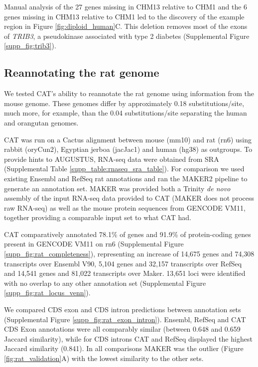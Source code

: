 \documentclass[fleqn,10pt]{wlscirep}
\begin{document}
Manual analysis of the 27 genes missing in CHM13 relative to CHM1 and the 6 genes missing in CHM13 relative to CHM1 led to the discovery of the example region in Figure \ref{fig:diploid_human}C. This deletion removes most of the exons of \textit{TRIB3}, a pseudokinase associated with type 2 diabetes \cite{shi2009association} (Supplemental Figure \ref{supp_fig:trib3}).

\subsection*{Reannotating the rat genome}

We tested CAT's ability to reannotate the rat genome using information from the mouse genome. These genomes differ by approximately 0.18 substitutions/site, much more, for example, than the 0.04 substitutions/site separating the human and orangutan genomes\cite{karolchik2003ucsc}.

CAT was run on a Cactus alignment between mouse (mm10) and rat (rn6) using rabbit (oryCun2), Egyptian jerboa (jacJac1) and human (hg38) as outgroups. To provide hints to AUGUSTUS, RNA-seq data were obtained from SRA \cite{fushan2015gene,cortez2014origins,liu2016identification} (Supplemental Table \ref{supp_table:rnaseq_sra_table}). For comparison we used existing Ensembl and RefSeq rat annotations and ran the MAKER2 pipeline \cite{cantarel2008maker} to generate an annotation set. MAKER was provided both a Trinity \cite{haas2013novo} \textit{de novo} assembly of the input RNA-seq data provided to CAT (MAKER does not process raw RNA-seq) as well as the mouse protein sequences from GENCODE VM11, together providing a comparable input set to what CAT had. 
  
CAT comparatively annotated 78.1\% of genes and 91.9\% of protein-coding genes present in GENCODE VM11 on rn6 (Supplemental Figure \ref{supp_fig:rat_completeness}), representing an increase of 14,675 genes and 74,308 transcripts over Ensembl V90, 5,104 genes and 32,157 transcripts over RefSeq and 14,541 genes and 81,022 transcripts over Maker. 13,651 loci were identified with no overlap to any other annotation set (Supplemental Figure \ref{supp_fig:rat_locus_venn}).

We compared CDS exon and CDS intron predictions between annotation sets (Supplemental Figure \ref{supp_fig:rat_exon_intron}). Ensembl, RefSeq and CAT CDS Exon annotations were all comparably similar (between 0.648 and 0.659 Jaccard similarity), while for CDS introns CAT and RefSeq displayed the highest Jaccard similarity (0.841). In all comparisons MAKER was the outlier (Figure \ref{fig:rat_validation}A) with the lowest similarity to the other sets.
  
\end{document}
